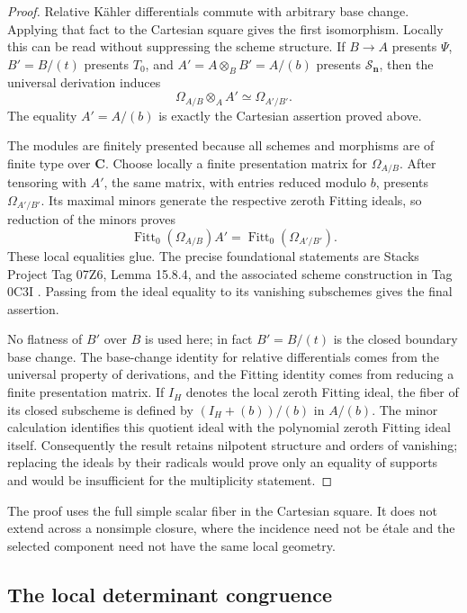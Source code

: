 \documentclass[11pt]{article}
\theoremstyle{definition}
\theoremstyle{remark}
\newcommand{\C}{\mathbf C}
\newcommand{\cS}{\mathcal S}
\newcommand{\bn}{\mathbf n}
\newcommand{\Fitt}{\operatorname{Fitt}}
\begin{document}
\begin{proof}
Relative Kähler differentials commute with arbitrary base change.  Applying
that fact to the Cartesian square gives the first isomorphism.  Locally this
can be read without suppressing the scheme structure.  If $B\to A$ presents
$\Psi$, $B'=B/(t)$ presents $T_0$, and
$A'=A\otimes_BB'=A/(b)$ presents $\cS_{\bn}$, then the universal derivation
induces
\[
  \Omega_{A/B}\otimes_AA'\simeq\Omega_{A'/B'}.
\]
The equality $A'=A/(b)$ is exactly the Cartesian assertion proved above.

The modules are finitely presented because all schemes and morphisms are of
finite type over $\C$.  Choose locally a finite presentation matrix for
$\Omega_{A/B}$.  After tensoring with $A'$, the same matrix, with entries
reduced modulo $b$, presents $\Omega_{A'/B'}$.  Its maximal minors generate
the respective zeroth Fitting ideals, so reduction of the minors proves
\[
  \Fitt_0(\Omega_{A/B})A'
  =\Fitt_0(\Omega_{A'/B'}).
\]
These local equalities glue.  The precise foundational statements are
Stacks Project Tag 07Z6, Lemma 15.8.4, and the associated scheme
construction in Tag 0C3I \cite{StacksProject}.  Passing from the ideal
equality to its vanishing subschemes gives the final assertion.

No flatness of $B'$ over $B$ is used here; in fact $B'=B/(t)$ is the closed
boundary base change.  The base-change identity for relative differentials
comes from the universal property of derivations, and the Fitting identity
comes from reducing a finite presentation matrix.  If $I_H$ denotes the
local zeroth Fitting ideal, the fiber of its closed subscheme is defined by
$(I_H+(b))/(b)$ in $A/(b)$.  The minor calculation identifies this quotient
ideal with the polynomial zeroth Fitting ideal itself.  Consequently the
result retains nilpotent structure and orders of vanishing; replacing the
ideals by their radicals would prove only an equality of supports and would
be insufficient for the multiplicity statement.
\end{proof}

The proof uses the full simple scalar fiber in the Cartesian square.  It
does not extend across a nonsimple closure, where the incidence need not be
étale and the selected component need not have the same local geometry.

\subsection{The local determinant congruence}
\end{document}
